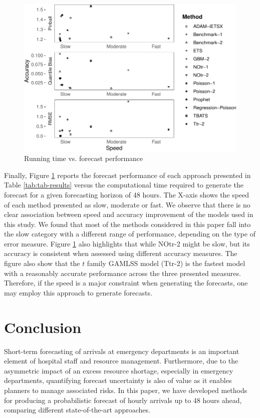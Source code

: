 \documentclass[]{elsarticle} %
\begin{document}
\begin{figure}[H]

{\centering \includegraphics[width=0.7\linewidth]{paper_files/figure-latex/time-accuracy-1} 

}

\caption{Running time vs. forecast performance}\label{fig:time-accuracy}
\end{figure}

Finally, Figure \ref{fig:time-accuracy} reports the forecast performance of each approach presented in Table \ref{tab:tab-results} versus the computational time required to generate the forecast for a given forecasting horizon of 48 hours. The X-axis shows the speed of each method presented as slow, moderate or fast. We observe that there is no clear association between speed and accuracy improvement of the models used in this study. We found that most of the methods considered in this paper fall into the slow category with a different range of performance, depending on the type of error measure. Figure \ref{fig:time-accuracy} also highlights that while NOtr-2 might be slow, but its accuracy is consistent when assessed using different accuracy measures. The figure also show that the \(t\) family GAMLSS model (Ttr-2) is the fastest model with a reasonably accurate performance across the three presented measures. Therefore, if the speed is a major constraint when generating the forecasts, one may employ this approach to generate forecasts.

\hypertarget{conclusion}{%
\section{Conclusion}\label{conclusion}}

Short-term forecasting of arrivals at emergency departments is an important element of hospital staff and resource management. Furthermore, due to the asymmetric impact of an excess resource shortage, especially in emergency departments, quantifying forecast uncertainty is also of value as it enables planners to manage associated risks. In this paper, we have developed methods for producing a probabilistic forecast of hourly arrivals up to 48 hours ahead, comparing different state-of-the-art approaches.
\end{document}
